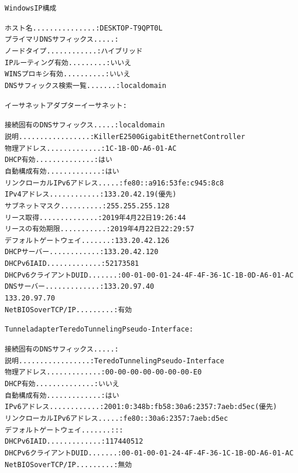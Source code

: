 \documentclass[10pt]{article}
\begin{document}
\begin{alltt}
Windows IP 構成

ホスト名. . . . . . . . . . . . . . .: DESKTOP-T9QPT0L
プライマリ DNS サフィックス . . . . .: 
ノード タイプ . . . . . . . . . . . .: ハイブリッド
IP ルーティング有効 . . . . . . . . .: いいえ
WINS プロキシ有効 . . . . . . . . . .: いいえ
DNS サフィックス検索一覧. . . . . . .: localdomain

イーサネット アダプター イーサネット:

接続固有の DNS サフィックス . . . . .: localdomain
説明. . . . . . . . . . . . . . . . .: Killer E2500 Gigabit Ethernet Controller
物理アドレス. . . . . . . . . . . . .: 1C-1B-0D-A6-01-AC
DHCP 有効 . . . . . . . . . . . . . .: はい
自動構成有効. . . . . . . . . . . . .: はい
リンクローカル IPv6 アドレス. . . . .: fe80::a916:53fe:c945:8c8%
IPv4 アドレス . . . . . . . . . . . .: 133.20.42.19(優先) 
サブネット マスク . . . . . . . . . .: 255.255.255.128
リース取得. . . . . . . . . . . . . .: 2019年4月22日 19:26:44
リースの有効期限. . . . . . . . . . .: 2019年4月22日 22:29:57
デフォルト ゲートウェイ . . . . . . .: 133.20.42.126
DHCP サーバー . . . . . . . . . . . .: 133.20.42.120
DHCPv6 IAID . . . . . . . . . . . . .: 52173581
DHCPv6 クライアント DUID. . . . . . .: 00-01-00-01-24-4F-4F-36-1C-1B-0D-A6-01-AC
DNS サーバー. . . . . . . . . . . . .: 133.20.97.40
133.20.97.70
NetBIOS over TCP/IP . . . . . . . . .: 有効

Tunnel adapter Teredo Tunneling Pseudo-Interface:

接続固有の DNS サフィックス . . . . .: 
説明. . . . . . . . . . . . . . . . .: Teredo Tunneling Pseudo-Interface
物理アドレス. . . . . . . . . . . . .: 00-00-00-00-00-00-00-E0
DHCP 有効 . . . . . . . . . . . . . .: いいえ
自動構成有効. . . . . . . . . . . . .: はい
IPv6 アドレス . . . . . . . . . . . .: 2001:0:348b:fb58:30a6:2357:7aeb:d5ec(優先) 
リンクローカル IPv6 アドレス. . . . .: fe80::30a6:2357:7aeb:d5ec%
デフォルト ゲートウェイ . . . . . . .: ::
DHCPv6 IAID . . . . . . . . . . . . .: 117440512
DHCPv6 クライアント DUID. . . . . . .: 00-01-00-01-24-4F-4F-36-1C-1B-0D-A6-01-AC
NetBIOS over TCP/IP . . . . . . . . .: 無効
\end{alltt} %

\noindent\makebox[\linewidth]{\rule{\paperwidth}{0.4pt}}
\end{document}
